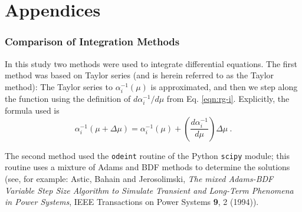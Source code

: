 \documentclass[12pt,a4paper,oneside]{article}
\begin{document}
\begin{thebibliography}{99}

\end{thebibliography}

\newpage
\appendix

\part*{Appendices}

\section{Comparison of Integration Methods}
\label{apx:tic}

In this study two methods were used to integrate differential equations. The first method was based on Taylor series (and is herein referred to as the Taylor method): The Taylor series to $\alpha^{-1}_i (\mu)$ is approximated, and then we step along the function using the definition of ${d \alpha^{-1}_i}/{d \mu}$ from Eq. \ref{eqn:rg-i}. Explicitly, the formula used is
\[
\alpha_i^{-1} (\mu + \Delta \mu) = \alpha_i^{-1} (\mu) + \left(\dfrac{d \alpha_i^{-1}}{d \mu}\right) \Delta \mu \:.
\]

The second method used the \texttt{odeint} routine of the Python \texttt{scipy} module; this routine uses a mixture of Adams and BDF methods to determine the solutions (see, for example: Astic, Bahain and Jerosolimski, \textit{The mixed Adams-BDF Variable Step Size Algorithm to Simulate Transient and Long-Term Phenomena in Power Systems}, IEEE Transactions on Power Systems \textbf{9}, 2 (1994)).
\end{document}
